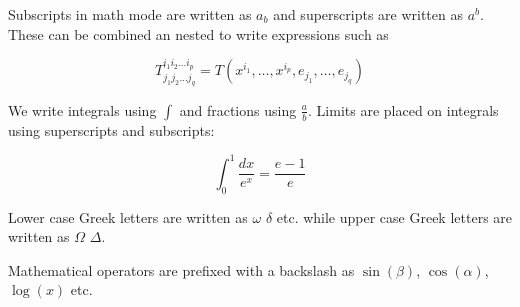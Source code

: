 \documentclass[12pt]{article}
\begin{document}
	Subscripts in math mode are written as $a_b$ and superscripts are written as $a^b$. These can be combined an nested to write expressions such as
	
	\[ T^{i_1 i_2 \dots i_p}_{j_1 j_2 \dots j_q} = T(x^{i_1},\dots,x^{i_p},e_{j_1},\dots,e_{j_q}) \]
	
	We write integrals using $\int$ and fractions using $\frac{a}{b}$. Limits are placed on integrals using superscripts and subscripts:
	
	\[ \int_0^1 \frac{dx}{e^x} =  \frac{e-1}{e} \]

	
	Lower case Greek letters are written as $\omega$ $\delta$ etc. while upper case Greek letters are written as $\Omega$ $\Delta$.
	
	Mathematical operators are prefixed with a backslash as $\sin(\beta)$, $\cos(\alpha)$, $\log(x)$ etc.
	
\end{document}
